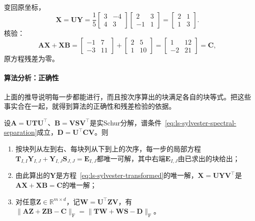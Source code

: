 \begin{example}
变回原坐标，
\[
 \bm X=\bm U\bm Y=\frac15\begin{bmatrix}3&-4\\4&3\end{bmatrix}\begin{bmatrix}2&3\\-1&1\end{bmatrix}=\begin{bmatrix}2&1\\1&3\end{bmatrix}.
\]
核验：
\[
 \bm A\bm X+\bm X\bm B
 =\begin{bmatrix}-1&7\\-3&11\end{bmatrix}+\begin{bmatrix}2&5\\1&10\end{bmatrix}
 =\begin{bmatrix}1&12\\-2&21\end{bmatrix}=\bm C ,
\]
原方程残差为零。
\end{example}

\paragraph{算法分析：正确性}
上面的推导说明每一步都能进行，而且按次序算出的块满足各自的块等式。把这些事实合在一起，就得到算法的正确性和残差检验的依据。

\begin{theorem}
\label{thm:ls-bartels-stewart}
设$\bm A=\bm U\bm T\bm U^\top$、$\bm B=\bm V\bm S\bm V^\top$是实Schur分解，谱条件~\eqref{eq:ls-sylvester-spectral-separation}成立，$\bm D=\bm U^\top\bm C\bm V$。则
\begin{enumerate}
 \item 按块列从左到右、每块列从下到上的次序，每一步的局部方程$\bm T_{I,I}\bm Y_{I,J}+\bm Y_{I,J}\bm S_{J,J}=\bm E_{I,J}$都唯一可解，其中右端$\bm E_{I,J}$由已求出的块给出；
 \item 由此算出的$\bm Y$是方程~\eqref{eq:ls-sylvester-transformed}的唯一解，$\bm X=\bm U\bm Y\bm V^\top$是$\bm A\bm X+\bm X\bm B=\bm C$的唯一解；
 \item 对任意$\bm Z\in\mathbb R^{m\times d}$，记$\bm W=\bm U^\top\bm Z\bm V$，有$\lVert\bm A\bm Z+\bm Z\bm B-\bm C\rVert_{\mathrm F}=\lVert\bm T\bm W+\bm W\bm S-\bm D\rVert_{\mathrm F}$。
\end{enumerate}
\end{theorem}


